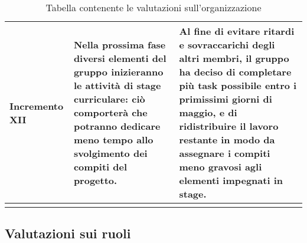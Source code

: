\begin{center}
\begin{longtable}{|p{3cm}|p{6cm}|p{6cm}|}
				Incremento XII
				&
				Nella prossima fase diversi elementi del gruppo inizieranno le attività di stage curriculare: ciò comporterà che potranno dedicare meno tempo allo svolgimento dei compiti del progetto.
				&
				Al fine di evitare ritardi e sovraccarichi degli altri membri, il gruppo ha deciso di completare più task possibile entro i primissimi giorni di maggio, e di ridistribuire il lavoro restante in modo da assegnare i compiti meno gravosi agli elementi impegnati in stage.\\
				\hline
				\caption{Tabella contenente le valutazioni sull'organizzazione}
        
			\end{longtable}
		\end{center}

	\subsection{Valutazioni sui ruoli}
